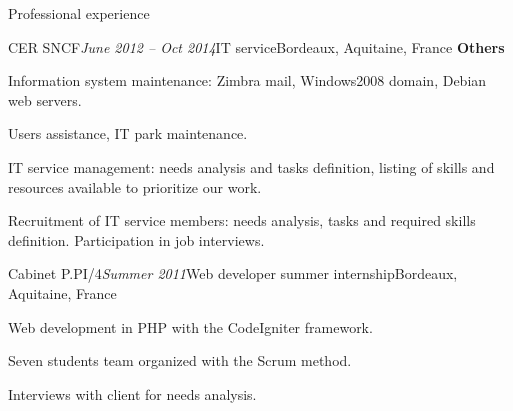 \begin{rSection}{Professional experience}
\begin{rSubsection}{CER SNCF}{\em June 2012 -- Oct 2014}{IT service}{Bordeaux, Aquitaine, France}
    \textbf{Others}
      \item Information system maintenance: Zimbra mail, Windows2008 domain, Debian web servers.
      \item Users assistance, IT park maintenance.
      \item IT service management: needs analysis and tasks definition, listing of skills and resources available to prioritize our work.
      \item Recruitment of IT service members: needs analysis, tasks and required skills definition. Participation in job interviews.

  \end{rSubsection}


  \begin{rSubsection}{Cabinet P.PI/4}{\em Summer 2011}{Web developer summer internship}{Bordeaux, Aquitaine, France}
    \item Web development in PHP with the CodeIgniter framework.
    \item Seven students team organized with the Scrum method.
    \item Interviews with client for needs analysis.
  \end{rSubsection}

\end{rSection}
